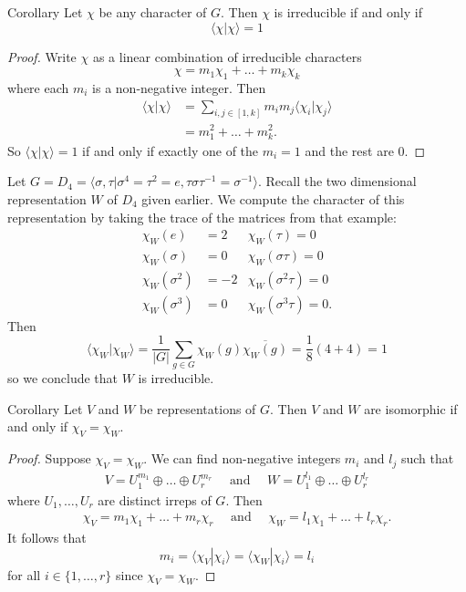\begin{frame}
\begin{block}{Corollary}
Let $\chi$ be any character of $G$.    Then $\chi$ is irreducible if and only if \[ \langle \chi | \chi \rangle = 1\]
\end{block}
\begin{proof}
Write $\chi$ as a linear combination of irreducible characters \[ \chi = m_1 \chi_1 + \ldots + m_k \chi_k \] where each $m_i$ is a non-negative integer.  Then
\begin{align*}
\langle \chi | \chi \rangle &= \sum_{i,j \in [1, k]} m_i m_j \langle \chi_i | \chi_j \rangle \\
&= m_1^2 + \ldots + m_k^2.
\end{align*}
So $\langle \chi | \chi \rangle = 1$ if and only if exactly one of the $m_i = 1$ and the rest are $0$.
\end{proof}
\end{frame}

\begin{frame}
\begin{example}
Let $G=D_4=  \langle \sigma, \tau |  \sigma^4 = \tau^2 = e, \tau \sigma \tau^{-1} = \sigma^{-1} \rangle$.  Recall the two dimensional representation $W$ of $D_4$ given earlier.
We compute the character of this representation by taking the trace of the matrices from that example:
\begin{align*}
\chi_W(e) &=2 & \chi_W(\tau) = 0 \\
\chi_W(\sigma) &= 0 &\chi_W (\sigma \tau) = 0 \\
\chi_W(\sigma^2) &= -2 &\chi_W (\sigma^2 \tau) = 0 \\
\chi_W(\sigma^3) &= 0 &\chi_W (\sigma^3 \tau) = 0.
\end{align*}
Then
\[ \langle \chi_W | \chi_W \rangle =\frac {1}{|G|} \sum_{g \in G} \chi_W (g) \overline{\chi_W (g)} = \frac{1}{8} (4 + 4) = 1\]
so we conclude that $W$ is irreducible.
\end{example}
\end{frame}


\begin{frame}[plain]
\begin{block}{Corollary}
Let $V$ and $W$ be representations of $G$.  Then $V$ and $W$ are isomorphic if and only if $\chi_V = \chi_W$.
\end{block}
\begin{proof}
Suppose $\chi_V = \chi_W$. We can find non-negative integers $m_i$ and $l_j$ such that
\begin{align*}
V = U_1^{m_1} \oplus \ldots \oplus U_r^{m_r} \quad \text{ and } \quad W = U_1^{l_1} \oplus \ldots \oplus U_r^{l_r}
\end{align*}
where $U_1, \ldots, U_r$ are distinct irreps of $G$.  Then
\begin{align*}
\chi_V = m_1 \chi_1 + \ldots + m_r \chi_r \quad \text{ and } \quad  \chi_W = l_1 \chi_1 + \ldots + l_r \chi_r .
\end{align*}
It follows that
\[ m_i = \langle \chi_V | \chi_i \rangle   = \langle \chi_W | \chi_i \rangle =  l_i \]
for all $i \in \{1, \ldots, r \}$ since $\chi_V = \chi_W$.
\end{proof}
\end{frame}

